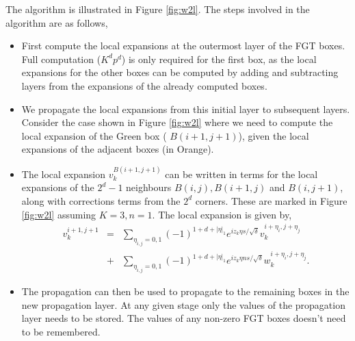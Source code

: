 The algorithm is illustrated in Figure \ref{fig:w2l}. The steps involved in the
algorithm are as follows, 
\begin{itemize} 
  \item First compute the local expansions at the outermost layer of the FGT
    boxes. Full computation ($K^dp^d$) is only required for the first box, as
    the local expansions for the other boxes can be computed by adding and
    subtracting layers from the expansions of the already computed boxes. 
  
  \item We propagate the local expansions from this initial layer to subsequent
    layers. Consider the case shown in Figure \ref{fig:w2l} where we need to
    compute the local expansion of the Green box ( $B(i+1,j+1)$), given the
    local expansions of the adjacent boxes (in Orange).  
  
  \item The local expansion $v_k^{B(i+1, j+1)}$ can be written in terms for the
    local expansions of the $2^d -1$ neighbours $B(i,j), B(i+1,j)$ and
    $B(i,j+1)$, along with corrections terms from the $2^d$ corners.
    These are marked in Figure \ref{fig:w2l} assuming $K=3, n=1$. 
    The local expansion is given by, 
    \begin{eqnarray*} 
    v_k^{i+1,j+1} &=& \sum_{\eta_{i,j} = 0,1} (-1)^{1 + d + |\eta|_1} e^{iz_k\eta s/\sqrt{\delta}} v_k^{i+\eta_i, j+\eta_j} \\
    & +& \sum_{\eta_{i,j}= 0,1} (-1)^{1 + d + |\eta|_1} e^{iz_k\eta ns/\sqrt{\delta}} w_k^{i+\eta_i, j+\eta_j}.
    \end{eqnarray*}
    
  
  \item The propagation can then be used to propagate to the remaining boxes in
    the new propagation layer. At any given stage only the values of the
    propagation layer needs to be stored. The values of any non-zero FGT boxes
    doesn't need to be remembered.

\end{itemize}


%	
%		
%	

